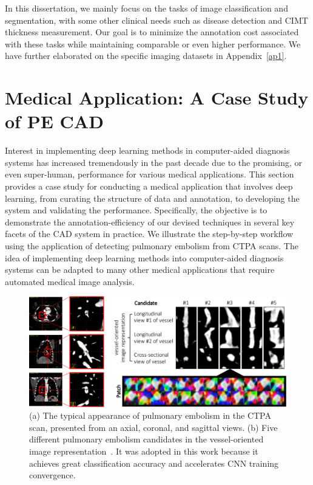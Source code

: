 In this dissertation, we mainly focus on the tasks of image classification and segmentation, with some other clinical needs such as disease detection and CIMT thickness measurement. Our goal is to minimize the annotation cost associated with these tasks while maintaining comparable or even higher performance. We have further elaborated on the specific imaging datasets in Appendix~\ref{ap1}.





\section{Medical Application: A Case Study of PE CAD}
\label{ch6:medical_applications}

Interest in implementing deep learning methods in computer-aided diagnosis systems has increased tremendously in the past decade due to the promising, or even super-human, performance for various medical applications. This section provides a case study for conducting a medical application that involves deep learning, from curating the structure of data and annotation, to developing the system and validating the performance. Specifically, the objective is to demonstrate the annotation-efficiency of our devised techniques in several key facets of the CAD system in practice. We illustrate the step-by-step workflow using the application of detecting pulmonary embolism from CTPA scans. The idea of implementing deep learning methods into computer-aided diagnosis systems can be adapted to many other medical applications that require automated medical image analysis.

\begin{figure}[t]
\begin{center}
\includegraphics[width=1.0\linewidth]{Figures/CH6/fig_pe_visualization.pdf}
\end{center}
\caption[Examples of Pulmonary Embolism in CTPA Images]{(a) The typical appearance of pulmonary embolism in the CTPA scan, presented from an axial, coronal, and sagittal views. (b) Five different pulmonary embolism candidates in the vessel-oriented image representation~\citep{tajbakhsh2015computer}. It was adopted in this work because it achieves great classification accuracy and accelerates CNN training convergence.}
\label{ch6:fig:pe_visualization}
\end{figure}

